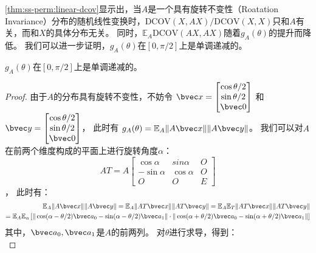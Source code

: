 \autoref{thm:ss-perm:linear-dcov}显示出，当$A$是一个具有旋转不变性（Roatation Invariance）分布的随机线性变换时，$\text{DCOV}(X, AX)/\text{DCOV}(X, X)$只和$A$有关，而和$X$的具体分布无关。
%
同时，$\mathbb E_A \text{DCOV}(AX, AX)$随着$g_A(\theta)$的提升而降低。
%
我们可以进一步证明，$g_A(\theta)$在$[0, \pi/2]$上是单调递减的。
%
\begin{corollary}
    $g_A(\theta)$在$[0, \pi/2]$上是单调递减的。
\end{corollary}
%
\begin{proof}
    由于$A$的分布具有旋转不变性，不妨令
    $\bvec x = \begin{bmatrix}
        \cos \theta/2 \\ \sin \theta/2 \\ \bvec 0   
    \end{bmatrix}$
    和
    $\bvec y = \begin{bmatrix}
        \cos \theta/2 \\ \sin \theta/2 \\ \bvec 0
    \end{bmatrix}$，
    此时有 $g_A(\theta) = \mathbb E_A \Vert A\bvec x\Vert \Vert A \bvec y\Vert$。
    我们可以对$A$在前两个维度构成的平面上进行旋转角度$\alpha$：
    \begin{equation}
        AT = A \begin{bmatrix}
            \cos \alpha & sin \alpha & O \\
            -\sin \alpha &\cos \alpha & O \\
            O & O & E
        \end{bmatrix}
    \end{equation}，
    此时有：
    \begin{equation}
    \begin{split}
        \mathbb E_A \Vert A\bvec x \Vert \Vert A \bvec y \Vert = \mathbb E_A \Vert AT \bvec x \Vert \Vert AT \bvec y \Vert = \mathbb E_A \mathbb E_T \Vert AT \bvec x \Vert \Vert AT \bvec y \Vert \\
        = \mathbb E_A \mathbb E_\alpha 
        \left[
        \Vert \cos(\alpha - \theta/2)\bvec a_0 - \sin (\alpha - \theta/2) \bvec a_1\Vert 
        \cdot
        \Vert \cos(\alpha + \theta/2)\bvec a_0 - \sin (\alpha + \theta/2) \bvec a_1\Vert
        \right]
    \end{split}   
    \end{equation}
    其中，$\bvec a_0, \bvec a_1$是$A$的前两列。
    对$\theta$进行求导，得到：
    \begin{equation}

\end{equation}
\end{proof}
